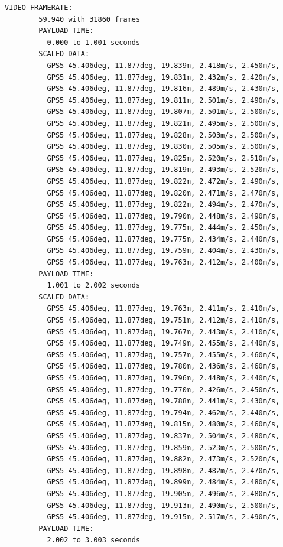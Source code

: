 \documentclass[11pt]{article}
\begin{document}
    \begin{lstlisting}[language=bash,caption={gpmf-parser output},label={lst:lstlisting}]
        VIDEO FRAMERATE:
        59.940 with 31860 frames
        PAYLOAD TIME:
          0.000 to 1.001 seconds
        SCALED DATA:
          GPS5 45.406deg, 11.877deg, 19.839m, 2.418m/s, 2.450m/s,
          GPS5 45.406deg, 11.877deg, 19.831m, 2.432m/s, 2.420m/s,
          GPS5 45.406deg, 11.877deg, 19.816m, 2.489m/s, 2.430m/s,
          GPS5 45.406deg, 11.877deg, 19.811m, 2.501m/s, 2.490m/s,
          GPS5 45.406deg, 11.877deg, 19.807m, 2.501m/s, 2.500m/s,
          GPS5 45.406deg, 11.877deg, 19.821m, 2.495m/s, 2.500m/s,
          GPS5 45.406deg, 11.877deg, 19.828m, 2.503m/s, 2.500m/s,
          GPS5 45.406deg, 11.877deg, 19.830m, 2.505m/s, 2.500m/s,
          GPS5 45.406deg, 11.877deg, 19.825m, 2.520m/s, 2.510m/s,
          GPS5 45.406deg, 11.877deg, 19.819m, 2.493m/s, 2.520m/s,
          GPS5 45.406deg, 11.877deg, 19.822m, 2.472m/s, 2.490m/s,
          GPS5 45.406deg, 11.877deg, 19.820m, 2.471m/s, 2.470m/s,
          GPS5 45.406deg, 11.877deg, 19.822m, 2.494m/s, 2.470m/s,
          GPS5 45.406deg, 11.877deg, 19.790m, 2.448m/s, 2.490m/s,
          GPS5 45.406deg, 11.877deg, 19.775m, 2.444m/s, 2.450m/s,
          GPS5 45.406deg, 11.877deg, 19.775m, 2.434m/s, 2.440m/s,
          GPS5 45.406deg, 11.877deg, 19.759m, 2.404m/s, 2.430m/s,
          GPS5 45.406deg, 11.877deg, 19.763m, 2.412m/s, 2.400m/s,
        PAYLOAD TIME:
          1.001 to 2.002 seconds
        SCALED DATA:
          GPS5 45.406deg, 11.877deg, 19.763m, 2.411m/s, 2.410m/s,
          GPS5 45.406deg, 11.877deg, 19.751m, 2.412m/s, 2.410m/s,
          GPS5 45.406deg, 11.877deg, 19.767m, 2.443m/s, 2.410m/s,
          GPS5 45.406deg, 11.877deg, 19.749m, 2.455m/s, 2.440m/s,
          GPS5 45.406deg, 11.877deg, 19.757m, 2.455m/s, 2.460m/s,
          GPS5 45.406deg, 11.877deg, 19.780m, 2.436m/s, 2.460m/s,
          GPS5 45.406deg, 11.877deg, 19.796m, 2.448m/s, 2.440m/s,
          GPS5 45.406deg, 11.877deg, 19.770m, 2.426m/s, 2.450m/s,
          GPS5 45.406deg, 11.877deg, 19.788m, 2.441m/s, 2.430m/s,
          GPS5 45.406deg, 11.877deg, 19.794m, 2.462m/s, 2.440m/s,
          GPS5 45.406deg, 11.877deg, 19.815m, 2.480m/s, 2.460m/s,
          GPS5 45.406deg, 11.877deg, 19.837m, 2.504m/s, 2.480m/s,
          GPS5 45.406deg, 11.877deg, 19.859m, 2.523m/s, 2.500m/s,
          GPS5 45.406deg, 11.877deg, 19.882m, 2.473m/s, 2.520m/s,
          GPS5 45.406deg, 11.877deg, 19.898m, 2.482m/s, 2.470m/s,
          GPS5 45.406deg, 11.877deg, 19.899m, 2.484m/s, 2.480m/s,
          GPS5 45.406deg, 11.877deg, 19.905m, 2.496m/s, 2.480m/s,
          GPS5 45.406deg, 11.877deg, 19.913m, 2.490m/s, 2.500m/s,
          GPS5 45.406deg, 11.877deg, 19.915m, 2.517m/s, 2.490m/s,
        PAYLOAD TIME:
          2.002 to 3.003 seconds
    \end{lstlisting}
\end{document}
